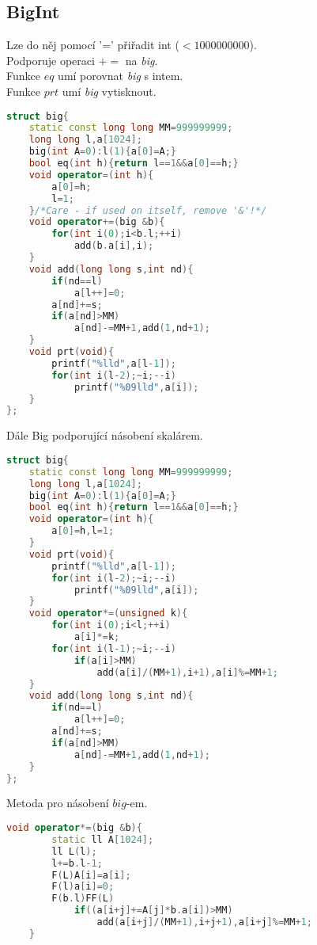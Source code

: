 \documentclass[11pt]{article}
\begin{document}
\subsection{BigInt}
Lze do něj pomocí '=' přiřadit int ($<1000000000$).
\\Podporuje operaci $+=$ na \textsl{big}.
\\Funkce $eq$ umí porovnat \textsl{big} s intem.
\\Funkce $prt$ umí \textsl{big} vytisknout.
\begin{lstlisting}[language=C++]
struct big{
    static const long long MM=999999999;
    long long l,a[1024];
    big(int A=0):l(1){a[0]=A;}
    bool eq(int h){return l==1&&a[0]==h;}
    void operator=(int h){
        a[0]=h;
        l=1;
    }/*Care - if used on itself, remove '&'!*/
    void operator+=(big &b){
        for(int i(0);i<b.l;++i)
            add(b.a[i],i);
    }
    void add(long long s,int nd){
        if(nd==l)
            a[l++]=0;
        a[nd]+=s;
        if(a[nd]>MM)
            a[nd]-=MM+1,add(1,nd+1);
    }
    void prt(void){
        printf("%lld",a[l-1]);
        for(int i(l-2);~i;--i)
            printf("%09lld",a[i]);
    }
};
\end{lstlisting}
\begin{center}
Dále Big podporující násobení skalárem.
\end{center}
\begin{lstlisting}[language=C++]
struct big{
    static const long long MM=999999999;
    long long l,a[1024];
    big(int A=0):l(1){a[0]=A;}
    bool eq(int h){return l==1&&a[0]==h;}
    void operator=(int h){
        a[0]=h,l=1;
    }
    void prt(void){
        printf("%lld",a[l-1]);
        for(int i(l-2);~i;--i)
            printf("%09lld",a[i]);
    }
    void operator*=(unsigned k){
        for(int i(0);i<l;++i)
            a[i]*=k;
        for(int i(l-1);~i;--i)
            if(a[i]>MM)
                add(a[i]/(MM+1),i+1),a[i]%=MM+1;
    }
    void add(long long s,int nd){
        if(nd==l)
            a[l++]=0;
        a[nd]+=s;
        if(a[nd]>MM)
            a[nd]-=MM+1,add(1,nd+1);
    }
};
\end{lstlisting}
Metoda pro násobení $big$-em.
\begin{lstlisting}[language=C++]
    void operator*=(big &b){
        static ll A[1024];
        ll L(l);
        l+=b.l-1;
        F(L)A[i]=a[i];
        F(l)a[i]=0;
        F(b.l)FF(L)
            if((a[i+j]+=A[j]*b.a[i])>MM)
                add(a[i+j]/(MM+1),i+j+1),a[i+j]%=MM+1;
    }
\end{lstlisting}
\end{document}
